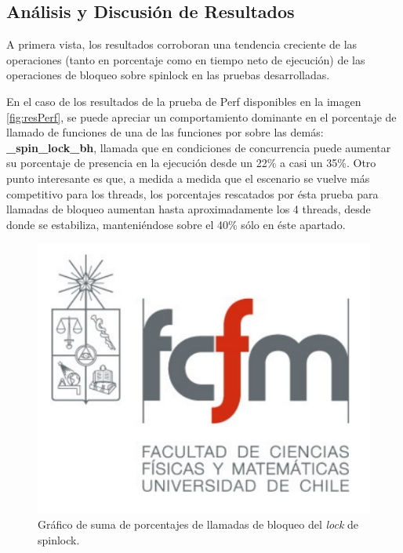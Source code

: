 \subsection{Análisis y Discusión de Resultados}
A primera vista, los resultados corroboran una tendencia creciente de las operaciones (tanto en porcentaje como en tiempo neto de ejecución) de las operaciones de bloqueo sobre spinlock en las pruebas desarrolladas.

En el caso de los resultados de la prueba de Perf disponibles en la imagen \ref{fig:resPerf}, se puede apreciar un comportamiento dominante en el porcentaje de llamado de funciones de una de las funciones por sobre las demás: \textbf{_spin_lock_bh}, llamada que en condiciones de concurrencia puede aumentar su porcentaje de presencia en la ejecución desde un 22\% a casi un 35\%. Otro punto interesante es que, a medida a medida que el escenario se vuelve más competitivo para los threads, los porcentajes rescatados por ésta prueba para llamadas de bloqueo aumentan hasta aproximadamente los 4 threads, desde donde se estabiliza, manteniéndose sobre el 40\% sólo en éste apartado.

\begin{figure}[!h]
	\centering
	\includegraphics[scale=.6]{imagenes/fcfm}
	\caption{Gráfico de suma de porcentajes de llamadas de bloqueo del \emph{lock} de spinlock.}
	\label{fig:sumaperf}
\end{figure}

